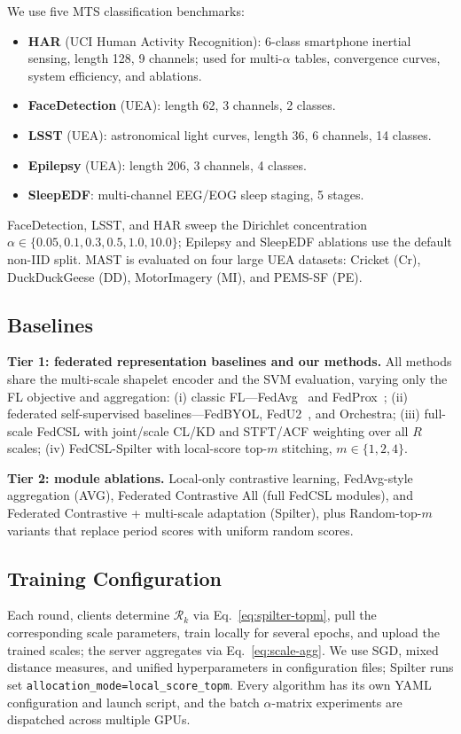 \documentclass[sigconf]{acmart}
\begin{document}
We use five MTS classification benchmarks:
\begin{itemize}
  \item \textbf{HAR} (UCI Human Activity Recognition): 6-class smartphone
        inertial sensing, length 128, 9 channels; used for multi-$\alpha$
        tables, convergence curves, system efficiency, and ablations.
  \item \textbf{FaceDetection} (UEA): length 62, 3 channels, 2 classes.
  \item \textbf{LSST} (UEA): astronomical light curves, length 36, 6 channels,
        14 classes.
  \item \textbf{Epilepsy} (UEA): length 206, 3 channels, 4 classes.
  \item \textbf{SleepEDF}: multi-channel EEG/EOG sleep staging, 5 stages.
\end{itemize}
FaceDetection, LSST, and HAR sweep the Dirichlet concentration
$\alpha\in\{0.05,0.1,0.3,0.5,1.0,10.0\}$; Epilepsy and SleepEDF ablations use the
default non-IID split. MAST is evaluated on four large UEA datasets: Cricket
(Cr), DuckDuckGeese (DD), MotorImagery (MI), and PEMS-SF (PE).

\subsection{Baselines}

\textbf{Tier 1: federated representation baselines and our methods.} All methods
share the multi-scale shapelet encoder and the SVM evaluation, varying only the
FL objective and aggregation: (i) classic FL---FedAvg~\cite{fedavg} and
FedProx~\cite{fedprox}; (ii) federated self-supervised baselines---FedBYOL,
FedU2~\cite{fedu2}, and Orchestra; (iii) full-scale FedCSL with joint/scale CL/KD
and STFT/ACF weighting over all $R$ scales; (iv) FedCSL-Spilter with local-score
top-$m$ stitching, $m\in\{1,2,4\}$.

\textbf{Tier 2: module ablations.} Local-only contrastive learning, FedAvg-style
aggregation (AVG), Federated Contrastive All (full FedCSL modules), and
Federated Contrastive + multi-scale adaptation (Spilter), plus Random-top-$m$
variants that replace period scores with uniform random scores.

\subsection{Training Configuration}

Each round, clients determine $\mathcal{R}_k$ via Eq.~\eqref{eq:spilter-topm},
pull the corresponding scale parameters, train locally for several epochs, and
upload the trained scales; the server aggregates via Eq.~\eqref{eq:scale-agg}. We
use SGD, mixed distance measures, and unified hyperparameters in configuration
files; Spilter runs set \texttt{allocation\_mode=local\_score\_topm}. Every
algorithm has its own YAML configuration and launch script, and the batch
$\alpha$-matrix experiments are dispatched across multiple GPUs.
\end{document}
